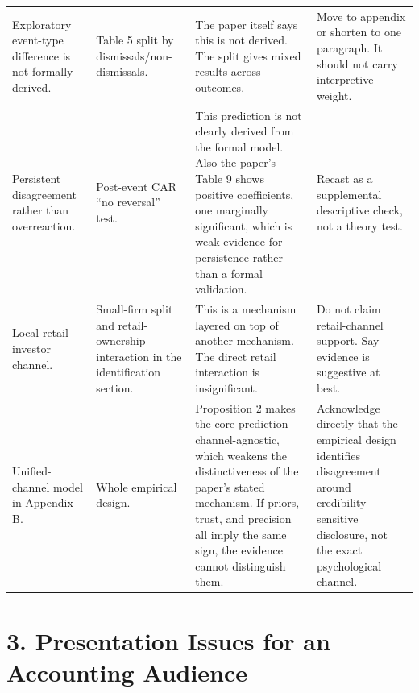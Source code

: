 \documentclass[11pt]{article}
\begin{document}
\begin{longtable}{>{\RaggedRight\arraybackslash}p{} >{\RaggedRight\arraybackslash}p{} >{\RaggedRight\arraybackslash}p{} >{\RaggedRight\arraybackslash}p{}}
Exploratory event-type difference is not formally derived. & Table 5 split by dismissals/non-dismissals. & The paper itself says this is not derived. The split gives mixed results across outcomes. & Move to appendix or shorten to one paragraph. It should not carry interpretive weight. \\

Persistent disagreement rather than overreaction. & Post-event CAR ``no reversal'' test. & This prediction is not clearly derived from the formal model. Also the paper's Table 9 shows positive coefficients, one marginally significant, which is weak evidence for persistence rather than a formal validation. & Recast as a supplemental descriptive check, not a theory test. \\

Local retail-investor channel. & Small-firm split and retail-ownership interaction in the identification section. & This is a mechanism layered on top of another mechanism. The direct retail interaction is insignificant. & Do not claim retail-channel support. Say evidence is suggestive at best. \\

Unified-channel model in Appendix B. & Whole empirical design. & Proposition 2 makes the core prediction channel-agnostic, which weakens the distinctiveness of the paper's stated mechanism. If priors, trust, and precision all imply the same sign, the evidence cannot distinguish them. & Acknowledge directly that the empirical design identifies disagreement around credibility-sensitive disclosure, not the exact psychological channel. \\

\bottomrule
\end{longtable}
\normalsize

\section*{3. Presentation Issues for an Accounting Audience}
\end{document}
